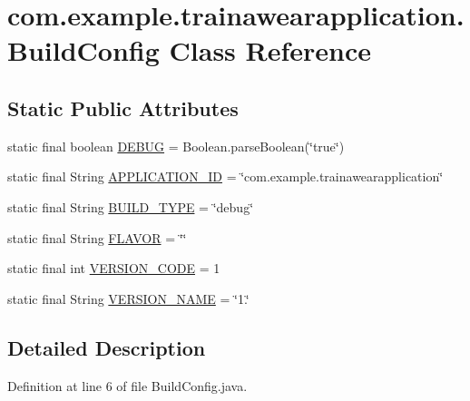 \hypertarget{classcom_1_1example_1_1trainawearapplication_1_1_build_config}{}\section{com.\+example.\+trainawearapplication.\+Build\+Config Class Reference}
\label{classcom_1_1example_1_1trainawearapplication_1_1_build_config}
\subsection*{Static Public Attributes}
\begin{DoxyCompactItemize}
\item 
static final boolean \mbox{\hyperlink{classcom_1_1example_1_1trainawearapplication_1_1_build_config_afb34a1bf8930af6319d488f530ee88af}{D\+E\+B\+UG}} = Boolean.\+parse\+Boolean(\char`\"{}true\char`\"{})
\item 
static final String \mbox{\hyperlink{classcom_1_1example_1_1trainawearapplication_1_1_build_config_a67fa5bc10dadc2002b0a938c983dc102}{A\+P\+P\+L\+I\+C\+A\+T\+I\+O\+N\+\_\+\+ID}} = \char`\"{}com.\+example.\+trainawearapplication\char`\"{}
\item 
static final String \mbox{\hyperlink{classcom_1_1example_1_1trainawearapplication_1_1_build_config_a63558fcf9cd538e4477bb78a87720e18}{B\+U\+I\+L\+D\+\_\+\+T\+Y\+PE}} = \char`\"{}debug\char`\"{}
\item 
static final String \mbox{\hyperlink{classcom_1_1example_1_1trainawearapplication_1_1_build_config_ac41197dac361e80e188ba2ef946485d2}{F\+L\+A\+V\+OR}} = \char`\"{}\char`\"{}
\item 
static final int \mbox{\hyperlink{classcom_1_1example_1_1trainawearapplication_1_1_build_config_a06eccc0ff61ab87852c841cd4acf4da4}{V\+E\+R\+S\+I\+O\+N\+\_\+\+C\+O\+DE}} = 1
\item 
static final String \mbox{\hyperlink{classcom_1_1example_1_1trainawearapplication_1_1_build_config_a12c3ac31a655a45a92131508009313e2}{V\+E\+R\+S\+I\+O\+N\+\_\+\+N\+A\+ME}} = \char`\"{}1.\char`\"{}
\end{DoxyCompactItemize}


\subsection{Detailed Description}


Definition at line 6 of file Build\+Config.\+java.



